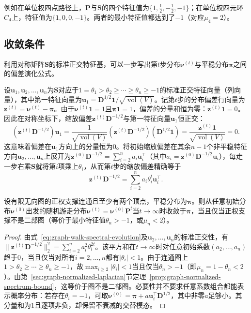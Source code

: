 例如在单位权四点路径上，$\bm P$与$\bm S$的四个特征值为$\{1,\frac12,-\frac12,-1\}$；在单位权四元环$C_4$上，特征值为$\{1,0,0,-1\}$。两者的最小特征值都达到了$-1$（对应$\mu_4=2$）。

\subsection{收敛条件}
\label{sec:graph-walk-convergence-condition}

利用对称矩阵$\bm S$的标准正交特征基，可以一步写出第$t$步分布$\bm\nu^{(t)}$与平稳分布$\bm\pi$之间的偏差演化公式。

设$\bm u_1,\bm u_2,\ldots,\bm u_n$为$\bm S$对应于$1=\theta_1>\theta_2\geq\cdots\geq\theta_n\geq -1$的标准正交特征向量（列向量），其中第一特征向量为$\bm u_1=\bm D^{1/2}\bm 1/\sqrt{\operatorname{vol}(V)}$。记第$t$步的分布偏差行向量为$\bm z^{(t)}=\bm\nu^{(t)}-\bm\pi$。由于$\bm\nu^{(t)}\bm 1=1$且$\bm\pi\bm 1=1$，偏差的分量和恒为零：$\bm z^{(t)}\bm 1=0$。因此在对称坐标下，缩放偏差$\bm z^{(t)}\bm D^{-1/2}$与第一特征向量$\bm u_1$恒正交：
\[
(\bm z^{(t)}\bm D^{-1/2})\bm u_1
=\frac{1}{\sqrt{\operatorname{vol}(V)}}(\bm z^{(t)}\bm D^{-1/2})(\bm D^{1/2}\bm 1)
=\frac{\bm z^{(t)}\bm 1}{\sqrt{\operatorname{vol}(V)}}=0.
\]
这意味着偏差在$\bm u_1$方向上的分量恒为$0$。将初始缩放偏差在其余$n-1$个非平稳特征方向$\bm u_2,\ldots,\bm u_n$上展开为$\bm z^{(0)}\bm D^{-1/2}=\sum_{i=2}^n a_i\bm u_i^\top$（其中$a_i=\bm z^{(0)}\bm D^{-1/2}\bm u_i$），每走一步右乘$\bm S$就将第$i$项乘上$\theta_i$，从而第$t$步的缩放偏差精确等于
\begin{equation}
\bm{z}^{(t)}\bm{D}^{-1/2}
=\sum_{i=2}^n a_i\theta_i^t\bm{u}_i^\top.
\label{eq:graph-walk-spectral-evolution}
\end{equation}

\begin{theorem}[无向连通图随机游走的收敛判别]
\label{thm:graph-walk-convergence}
设有限无向图的正权支撑连通且至少有两个顶点，平稳分布为$\bm\pi$。则从任意初始分布$\bm\nu^{(0)}$出发的随机游走分布$\bm\nu^{(t)}=\bm\nu^{(0)}\bm P^t$当$t\to\infty$时收敛于$\bm\pi$，当且仅当正权支撑不是二部图（等价于最小特征值$\theta_n>-1$，或$\mu_n<2$）。
\end{theorem}

\begin{proof}
由式~\eqref{eq:graph-walk-spectral-evolution}及$\bm u_2,\ldots,\bm u_n$的标准正交性，有$\lVert\bm z^{(t)}\bm D^{-1/2}\rVert_2^2=\sum_{i=2}^n a_i^2\theta_i^{2t}$。该平方和在$t\to\infty$时对任意初始系数$(a_2,\ldots,a_n)$趋于$0$，当且仅当对所有$i=2,\ldots,n$都有$|\theta_i|<1$。由于连通图上$1>\theta_2\geq\cdots\geq\theta_n\geq -1$，故$\max_{i\geq 2}|\theta_i|<1$当且仅当$\theta_n>-1$（即$\mu_n=1-\theta_n<2$）。由第~\ref{sec:graph-normalized-laplacian}节定理~\ref{prop:graph-normalized-spectrum-bound}，这等价于图不是二部图。必要性并不要求任意系数组合都能表示概率分布：若存在$\theta_i=-1$，可取$\bm\nu^{(0)}=\bm\pi+a\bm u_i^\top\bm D^{1/2}$，其中非零$a$足够小。其分量和为$1$且逐项非负，却保留不衰减的交替模态。
\end{proof}

